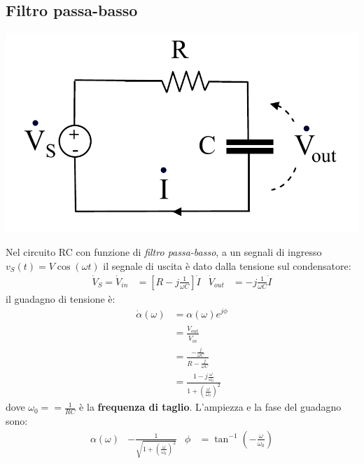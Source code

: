 \documentclass{article}
\begin{document}
\subsection{Filtro passa-basso}
\begin{center}
    \includegraphics[scale=0.3]{Image/Passa-basso_1.png}
\end{center}
Nel circuito RC con funzione di \textit{filtro passa-basso}, a un segnali di ingresso $v_S(t)=V \cos(\omega t)$ il segnale di uscita è dato dalla tensione sul condensatore:
\begin{align*}
    \dot V_S = \dot V_{in} &= \left[R - j \frac{1}{\omega C}\right]\dot I & \dot V_{out} &= -j \frac{1}{\omega C} \dot I
\end{align*}
il guadagno di tensione è:
\begin{align*}
    \dot \alpha(\omega) &= \alpha(\omega) e^{j \phi}
    \\
    &=\frac{\dot V_{out}}{\dot V_{in}}
    \\
    &= \frac{-\frac{j}{\omega C}}{R -\frac{j}{\omega C}}
    \\
    &= \frac{1-j \frac{\omega}{\omega_0}}{1 + \left(\frac{\omega}{\omega_0}\right)^2}
\end{align*}
dove $\omega_0 = =\frac{1}{RC}$ è la \textbf{frequenza di taglio}. L'ampiezza e la fase del guadagno sono:
\begin{align*}
    \alpha(\omega) &- \frac{1}{\sqrt{1+\left(\frac{\omega}{\omega_0}\right)^2}} & \phi &= \tan^{-1}\left(- \frac{\omega}{\omega_0}\right)
\end{align*}
\end{document}
